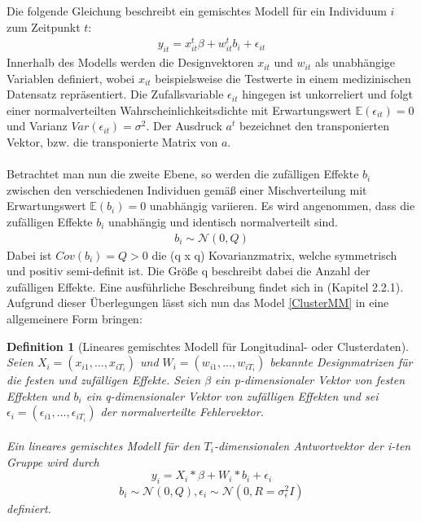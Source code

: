 \documentclass[%
thesis=student,%
coverpage=false,%
titlepage=false,%
headmarks=true, %
german,%
font=libertine, %
math=newpxtx, %
BCOR=5mm,%
coverBCOR=11mm%
]{tumbook}
\theoremstyle{break}
\newtheorem{definition}{Definition}[section]
\begin{document}
Die folgende Gleichung beschreibt ein gemischtes Modell für ein Individuum $i$ zum Zeitpunkt $t$:
\begin{align} 
	y_{it} = x^t_{it}\beta + w^t_{it}b_i + \epsilon_{it} \label{ClusterMM}
\end{align} \noindent
Innerhalb des Modells werden die Designvektoren $x_{it}$ und $w_{it}$ als unabhängige Variablen definiert, wobei $x_{it}$ beispielsweise die Testwerte in einem medizinischen Datensatz repräsentiert. Die Zufallsvariable $\epsilon_{it}$ hingegen ist unkorreliert und folgt einer normalverteilten Wahrscheinlichkeitsdichte mit Erwartungswert $ \mathbb{E}(\epsilon_{it}) = 0$ und Varianz $Var(\epsilon_{it}) = \sigma^2$.  Der Ausdruck $a^t$ bezeichnet den transponierten Vektor, bzw. die transponierte Matrix von $a$.\\
\\
Betrachtet man nun die zweite Ebene, so werden die zufälligen Effekte $b_i$ zwischen den verschiedenen Individuen gemäß einer Mischverteilung mit Erwartungswert $ \mathbb{E}(b_i)=0$ unabhängig variieren. Es wird angenommen, dass die zufälligen Effekte $b_i$ unabhängig und identisch normalverteilt sind.
\begin{align}
	b_i \sim \mathcal{N}(0,Q)
\end{align}\noindent
Dabei ist $Cov(b_i) = Q > 0$ die (q x q) Kovarianzmatrix, welche symmetrisch und positiv semi-definit ist. Die Größe q beschreibt dabei die Anzahl der zufälligen Effekte. Eine ausführliche Beschreibung findet sich in \cite{pinheiro2000} (Kapitel 2.2.1).
\\
Aufgrund dieser Überlegungen lässt sich nun das Model \ref{ClusterMM} in eine allgemeinere Form bringen:
\begin{definition}[Lineares gemischtes Modell für Longitudinal- oder Clusterdaten] \label{LMM für longitudinale Daten}
	Seien $X_i = (x_{i1}, ..., x_{iT_i})$  und $W_i = (w_{i1},...,w_{iT_i})$ bekannte Designmatrizen für die festen und zufälligen Effekte. Seien $\beta$ ein p-dimensionaler Vektor von festen Effekten und $b_i$ ein q-dimensionaler Vektor von zufälligen Effekten und sei $\epsilon_i = (\epsilon_{i1},...,\epsilon_{iT_i})$ der normalverteilte Fehlervektor.\\
	\\
	Ein lineares gemischtes Modell für den $T_i$-dimensionalen Antwortvektor der i-ten Gruppe wird durch 
	$$y_i = X_i * \beta + W_i * b_i + \epsilon_i$$ 
	$$b_i \sim \mathcal{N}(0,Q), \epsilon_i \sim \mathcal{N}(0,R = \sigma^2_\epsilon I)$$
	definiert.
\end{definition}\noindent
\end{document}
